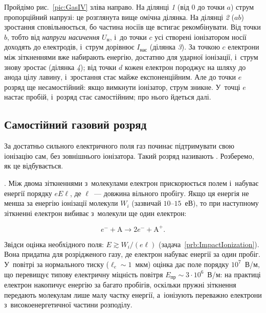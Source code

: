 Пройдімо рис.~\ref{pic:GasIV} зліва направо. На ділянці \emph{1} (від $0$ до точки $a$)
струм пропорційний напрузі: це розглянута вище омічна ділянка. На ділянці \emph{2} ($ab$)
зростання сповільнюється, бо частина носіїв ще встигає рекомбінувати. Від точки $b$, тобто
від \emph{напруги насичення} $U_{\text{н}}$, і~до точки $c$ усі створені іонізатором носії
доходять до електродів, і~струм дорівнює $I_{\text{нас}}$ (ділянка \emph{3}). За точкою $c$
електрони між зіткненнями вже набирають енергію, достатню для ударної іонізації, і~струм
знову зростає (ділянка \emph{4}); від точки $d$ кожен електрон породжує на шляху до анода цілу
лавину, і~зростання стає майже експоненційним. Але до точки $e$ розряд ще несамостійний:
якщо вимкнути іонізатор, струм зникне. У~точці $e$ настає пробій, і~розряд стає
самостійним; про нього йдеться далі.


\subsection*{Самостійний газовий розряд}


За достатньо сильного електричного поля газ починає підтримувати свою іонізацію сам, без
зовнішнього іонізатора. Такий розряд називають . Розберемо, як це
відбувається.

. Між двома зіткненнями з~молекулами електрон прискорюється полем
і~набуває енергії порядку $eE\ell$, де $\ell$~--- довжина вільного пробігу. Якщо ця
енергія не менша за енергію іонізації молекули $W_i$ (зазвичай $10$--$15$~еВ), то при
наступному зіткненні електрон вибиває з~молекули ще один електрон:

\begin{equation*}
	e^-+\mathrm{A}\longrightarrow 2e^-+\mathrm{A}^+.
\end{equation*}

Звідси оцінка необхідного поля: $E\gtrsim W_i/(e\ell)$
(задача~\ref{prb:ImpactIonization}). Вона придатна для розрідженого газу, де електрон
набуває енергії за один пробіг. У~повітрі за нормального тиску ($\ell_e\sim1$~мкм)
оцінка дає поле порядку $10^7$~В/м, що перевищує типову електричну міцність повітря
$E_{\text{пр}}\sim3\cdot10^6$~В/м: на практиці електрон накопичує енергію за багато
пробігів, оскільки пружні зіткнення передають молекулам лише малу частку енергії,
а~іонізують переважно електрони з~високоенергетичної частини розподілу.

